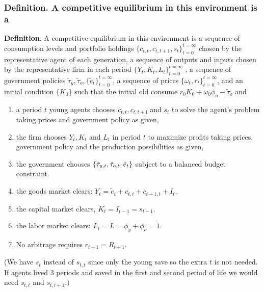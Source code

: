 \documentclass[aspectratio=169]{ltx-talk}
\begin{document}
\begin{frame}
\frametitle{Definition. A competitive equilibrium in this environment is a}
\textbf{Definition}. A competitive equilibrium in this environment is a
sequence of consumption levels and portfolio holdings $%
\{c_{t,t},c_{t,t+1},s_{t}\}_{t=0}^{t=\infty }$ chosen by the representative
agent of each generation, a sequence of outputs and inputs chosen by the
representative firm in each period $\{Y_{t},K_{t},L_{t}\}_{t=0}^{t=\infty }$%
, a sequence of government policies $\tilde{\tau}_{y},\tilde{\tau}_{o},\{%
\tilde{e}_{t}\}_{t=0}^{t=\infty }$, a sequence of prices $\{\omega
_{t},r_{t}\}_{t=0}^{t=\infty }$, and an initial condition $\{K_{0}\}$ such
that the initial old consume $r_{0}K_{0}+\omega _{0}\phi _{o}-\tilde{\tau}%
_{o}$ and

\begin{enumerate}
\item a period $t$ young agents chooses $c_{t,t},c_{t,t+1}\ $and $s_{t}$ to
solve the agent's problem taking prices and government policy as given,

\item the firm chooses $Y_{t},K_{t}$ and $L_{t}$ in period $t$ to maximize
profits taking prices, government policy and the production possibilities as
given,

\item the government chooses $\{\tilde{\tau}_{y,t},\tilde{\tau}_{o,t},\tilde{%
e}_{t}\}$ subject to a balanced budget constraint.

\item the goods market clears: $Y_{t}=\tilde{e}_{t}+c_{t,t}+c_{t-1,t}+I_{t}.$

\item the capital market clears, $K_{t}=I_{t-1}=s_{t-1}.$

\item the labor market clears: $L_{t}=L=\phi _{y}+\phi _{o}=1.$

\item No arbitrage requires $r_{t+1}=R_{t+1}$.\newline
\end{enumerate}

(We have $s_{t}$ instead of $s_{t,t}$ since only the young save so the extra 
$t$ is not needed. If agents lived 3 periods and saved in the first and
second period of life we would need $s_{t,t}$ and $s_{t,t+1}.)$
\end{frame}
\end{document}
